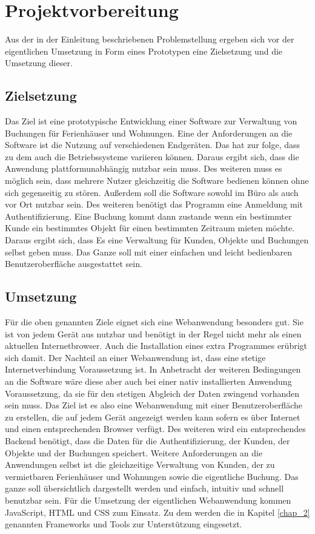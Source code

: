 \chapter{Projektvorbereitung}
Aus der in der Einleitung beschriebenen Problemstellung ergeben sich vor der eigentlichen Umsetzung in Form eines Prototypen eine Zielsetzung und die Umsetzung dieser.

\section{Zielsetzung}
Das Ziel ist eine prototypische Entwicklung einer Software zur Verwaltung von Buchungen für Ferienhäuser und Wohnungen. 
Eine der Anforderungen an die Software ist die Nutzung auf verschiedenen Endgeräten. Das hat zur folge, dass zu dem auch die Betriebssysteme variieren können. Daraus ergibt sich, dass die Anwendung plattformunabhängig nutzbar sein muss. Des weiteren muss es möglich sein, dass mehrere Nutzer gleichzeitig die Software bedienen können ohne sich gegenseitig zu stören. Außerdem soll die Software sowohl im Büro als auch vor Ort nutzbar sein.
Des weiteren benötigt das Programm eine Anmeldung mit Authentifizierung. 
Eine Buchung kommt dann zustande wenn ein bestimmter Kunde ein bestimmtes Objekt für einen bestimmten Zeitraum mieten möchte. Daraus ergibt sich, dass Es eine Verwaltung für Kunden, Objekte und Buchungen selbst geben muss. 
Das Ganze soll mit einer einfachen und leicht bedienbaren Benutzeroberfläche ausgestattet sein.

\newpage
\section{Umsetzung}
Für die oben genannten Ziele eignet sich eine Webanwendung besonders gut. Sie ist von jedem Gerät aus nutzbar und benötigt in der Regel nicht mehr als einen aktuellen Internetbrowser. Auch die Installation eines extra Programmes erübrigt sich damit. Der Nachteil an einer Webanwendung ist,  dass eine stetige Internetverbindung Voraussetzung ist. In Anbetracht der weiteren Bedingungen an die Software wäre diese aber auch bei einer nativ installierten Anwendung Voraussetzung, da sie für den stetigen Abgleich der Daten zwingend vorhanden sein muss. 
Das Ziel ist es also eine Webanwendung mit einer Benutzeroberfläche zu erstellen, die auf jedem Gerät angezeigt werden kann sofern es über Internet und einen entsprechenden Browser verfügt. Des weiteren wird ein entsprechendes Backend benötigt, dass die Daten für die Authentifizierung, der Kunden, der Objekte und der Buchungen speichert.
Weitere Anforderungen an die Anwendungen selbst ist die gleichzeitige Verwaltung von Kunden, der zu vermietbaren Ferienhäuser und Wohnungen sowie die eigentliche Buchung. Das ganze soll übersichtlich dargestellt werden und einfach, intuitiv und schnell benutzbar sein.
Für die Umsetzung der eigentlichen Webanwendung kommen JavaScript, HTML und CSS zum Einsatz. Zu dem werden die in Kapitel \ref{chap_2} genannten Frameworks und Tools zur Unterstützung eingesetzt. 

